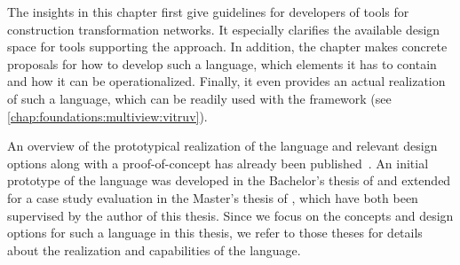 
The insights in this chapter first give guidelines for developers of tools for construction transformation networks.
It especially clarifies the available design space for tools supporting the \commonalities approach.
In addition, the chapter makes concrete proposals for how to develop such a language, which elements it has to contain and how it can be operationalized.
Finally, it even provides an actual realization of such a language, which can be readily used with the \vitruv framework (see \autoref{chap:foundations:multiview:vitruv}).

An overview of the prototypical realization of the \commonalities language and relevant design options along with a proof-of-concept has already been published~.
An initial prototype of the language was developed in the Bachelor's thesis of  and extended for a case study evaluation in the Master's thesis of , which have both been supervised by the author of this thesis.
Since we focus on the concepts and design options for such a language in this thesis, we refer to those theses for details about the realization and capabilities of the \commonalities language.





